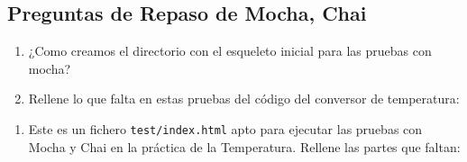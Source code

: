 \subsection{Preguntas de Repaso de Mocha,
Chai}\label{preguntas-de-repaso-de-mocha-chai}

\begin{enumerate}
\def\labelenumi{\arabic{enumi}.}
\itemsep1pt\parskip0pt
\item
  ¿Como creamos el directorio con el esqueleto inicial para las pruebas
  con mocha? 
\item
  Rellene lo que falta en estas pruebas del código del conversor de
  temperatura:
\end{enumerate}

\begin{Shaded}
\begin{Highlighting}[]
 \FunctionTok{______}\NormalTok{;}

\NormalTok{(}\NormalTok{, }\NormalTok{() \{}
    \NormalTok{(}\NormalTok{, }\NormalTok{() \{}
      \FunctionTok{_________}\NormalTok{([}\NormalTok{, \{}\NormalTok{:}\NormalTok{\}], [}\NormalTok{, \{}\NormalTok{:}\NormalTok{\}]);}
    \NormalTok{\});}
    \NormalTok{(}\NormalTok{, }\NormalTok{() \{}
         \NormalTok{= }\NormalTok{;}
        \NormalTok{();}
        \FunctionTok{_____}\NormalTok{(}\NormalTok{, }\NormalTok{);}
    \NormalTok{\});}
\NormalTok{\});}
 \NormalTok{;}
\end{Highlighting}
\end{Shaded}

\begin{enumerate}
\def\labelenumi{\arabic{enumi}.}
\setcounter{enumi}{2}
\itemsep1pt\parskip0pt
\item
  Este es un fichero \texttt{test/index.html} apto para ejecutar las
  pruebas con Mocha y Chai en la práctica de la Temperatura. Rellene las
  partes que faltan:
\end{enumerate}

